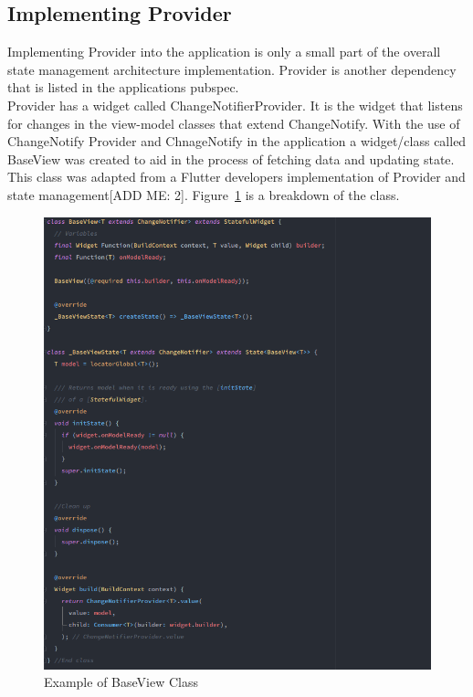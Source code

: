 \subsection{Implementing Provider}
Implementing Provider into the application is only a small part of the overall state management architecture implementation. Provider is another dependency that is listed in the applications pubspec.
\\ Provider has a widget called ChangeNotifierProvider. It is the widget that listens for changes in the view-model classes that extend ChangeNotify. With the use of ChangeNotify Provider and ChnageNotify in the application a widget/class called BaseView was created to aid in the process of fetching data and updating state. This class was adapted from a Flutter developers implementation of Provider and state management[ADD ME: 2]. Figure~\ref{image:baseViewClass} is a breakdown of the class.
\begin{figure}[h!]
    \caption{Example of BaseView Class}
    \label{image:baseViewClass}
    \centering
    \includegraphics[width=1.0\textwidth]{images/base_view_class_code.png}
\end{figure}
